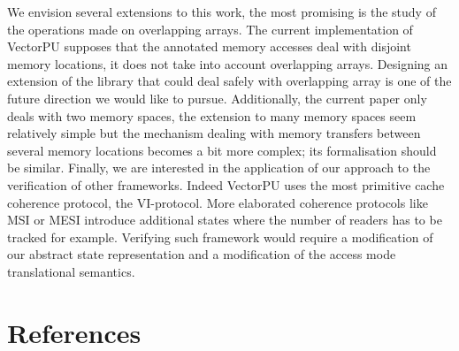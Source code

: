 \documentclass[preprint,12pt]{elsarticle}
\begin{document}
We envision several extensions to this work,  the most promising is the study 
of  the operations made on overlapping arrays. 
The current implementation of VectorPU supposes that the annotated memory 
accesses deal with disjoint memory locations, it does not 
take into account overlapping arrays. Designing an extension of the library that could 
deal safely with overlapping array is one of the future direction we would like to 
pursue. 
Additionally, the current paper only deals with two memory spaces, the extension to many 
memory spaces seem relatively simple but  the mechanism dealing 
with memory transfers between several memory locations becomes a bit more complex; its 
formalisation should be similar.
Finally, we are interested in the application of our approach to the 
verification of other frameworks. Indeed VectorPU uses the most primitive
 cache coherence protocol, the VI-protocol.
 More elaborated coherence protocols like MSI or MESI introduce additional
 states where the
 number of readers has to be tracked for example. Verifying such framework would require 
 a modification of our abstract state representation and a modification of the access 
 mode translational semantics.
\section*{References}
 

\end{document}
